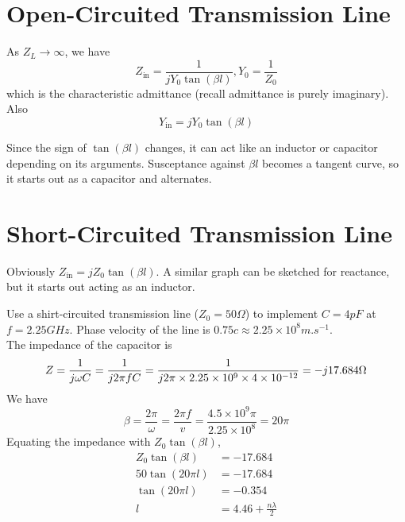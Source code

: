 \documentclass[12pt]{article}
\begin{document}
\section{Open-Circuited Transmission Line}

As $Z_L \rightarrow \infty$, we have
$$Z_{\text{in}} = \frac{1}{jY_0\tan(\beta l)}, Y_0 = \frac{1}{Z_0}$$
which is the characteristic admittance (recall admittance is purely imaginary). Also
$$Y_{\text{in}} = jY_0\tan(\beta l)$$

Since the sign of $\tan(\beta l)$ changes, it can act like an inductor or capacitor depending on its arguments. Susceptance against $\beta l$ becomes a tangent curve, so it starts out as a capacitor and alternates.

\section{Short-Circuited Transmission Line}

Obviously $Z_{\text{in}} = jZ_0\tan(\beta l)$. A similar graph can be sketched for reactance, but it starts out acting as an inductor.

\begin{ex}
    Use a shirt-circuited transmission line ($Z_0 = 50\unit{\Omega}$) to implement $C = 4\unit{pF}$ at $f = 2.25\unit{GHz}$. Phase velocity of the line is $0.75c \approx 2.25 \times 10^8\unit{m.s^{-1}}$. \\
    The impedance of the capacitor is
    $$Z = \frac{1}{j\omega C} = \frac{1}{j2\pi fC} = \frac{1}{j2\pi\times2.25\times10^9\times4\times10^{-12}} = -j17.684\unit\Omega$$
    We have
    $$\beta = \frac{2\pi}{\omega} = \frac{2\pi f}{v} = \frac{4.5\times10^9\pi}{2.25\times10^8} = 20\pi$$
    Equating the impedance with $Z_0\tan(\beta l)$,
    \begin{align*}
        Z_0\tan(\beta l) &= -17.684 \\
        50\tan(20\pi l) &= -17.684 \\
        \tan(20\pi l) &= -0.354 \\
        l &= 4.46 + \frac{n\lambda}{2}
    \end{align*}
\end{ex}
\end{document}
